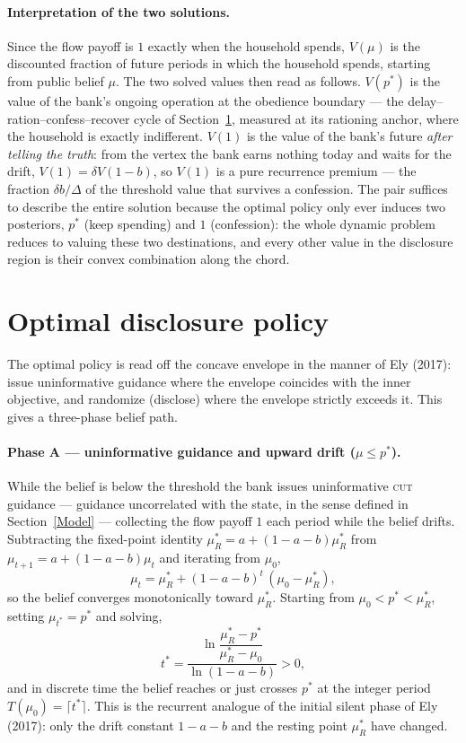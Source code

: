 \documentclass[12pt]{article}
\begin{document}
\paragraph{Interpretation of the two solutions.} Since the flow payoff is $1$ exactly when the household spends, $V(\mu)$ is the discounted fraction of future periods in which the household spends, starting from public belief $\mu$. The two solved values then read as follows. $V(p^*)$ is the value of the bank's ongoing operation at the obedience boundary --- the delay--ration--confess--recover cycle of Section~\ref{Policy}, measured at its rationing anchor, where the household is exactly indifferent. $V(1)$ is the value of the bank's future \emph{after telling the truth}: from the vertex the bank earns nothing today and waits for the drift, $V(1)=\delta V(1-b)$, so $V(1)$ is a pure recurrence premium --- the fraction $\delta b/\Delta$ of the threshold value that survives a confession. The pair suffices to describe the entire solution because the optimal policy only ever induces two posteriors, $p^*$ (keep spending) and $1$ (confession): the whole dynamic problem reduces to valuing these two destinations, and every other value in the disclosure region is their convex combination along the chord.

\section{Optimal disclosure policy}\label{Policy}

The optimal policy is read off the concave envelope in the manner of Ely (2017): issue uninformative guidance where the envelope coincides with the inner objective, and randomize (disclose) where the envelope strictly exceeds it. This gives a three-phase belief path.

\paragraph{Phase A --- uninformative guidance and upward drift ($\mu \le p^*$).} While the belief is below the threshold the bank issues uninformative \textsc{cut} guidance --- guidance uncorrelated with the state, in the sense defined in Section~\ref{Model} --- collecting the flow payoff $1$ each period while the belief drifts. Subtracting the fixed-point identity $\mu_R^* = a+(1-a-b)\mu_R^*$ from $\mu_{t+1} = a+(1-a-b)\mu_t$ and iterating from $\mu_0$,
\begin{equation}\label{eq:drift}
\mu_t = \mu_R^* + (1-a-b)^t\,(\mu_0 - \mu_R^*),
\end{equation}
so the belief converges monotonically toward $\mu_R^*$. Starting from $\mu_0 < p^* < \mu_R^*$, setting $\mu_{t^*} = p^*$ and solving,
\begin{equation}\label{eq:hit}
t^* = \frac{\ln\dfrac{\mu_R^*-p^*}{\mu_R^*-\mu_0}}{\ln(1-a-b)} > 0,
\end{equation}
and in discrete time the belief reaches or just crosses $p^*$ at the integer period $T(\mu_0) = \lceil t^* \rceil$. This is the recurrent analogue of the initial silent phase of Ely (2017): only the drift constant $1-a-b$ and the resting point $\mu_R^*$ have changed.
\end{document}
